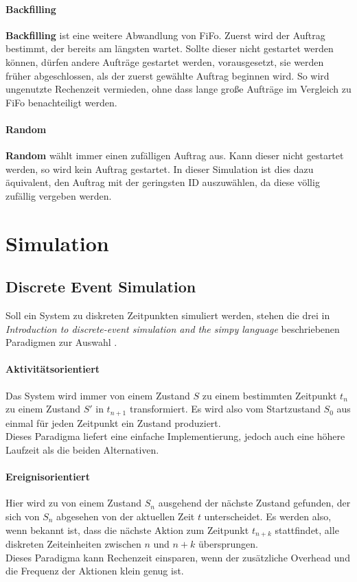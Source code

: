 \paragraph{Backfilling}
\textbf{Backfilling} ist eine weitere Abwandlung von FiFo. Zuerst wird der Auftrag bestimmt, der bereits am längsten wartet. Sollte dieser nicht gestartet werden können, dürfen andere Aufträge gestartet werden, vorausgesetzt, sie werden früher abgeschlossen, als der zuerst gewählte Auftrag beginnen wird. So wird ungenutzte Rechenzeit vermieden, ohne dass lange große Aufträge im Vergleich zu FiFo benachteiligt werden.

\paragraph{Random}
\textbf{Random} wählt immer einen zufälligen Auftrag aus. Kann dieser nicht gestartet werden, so wird kein Auftrag gestartet. In dieser Simulation ist dies dazu äquivalent, den Auftrag mit der geringsten ID auszuwählen, da diese völlig zufällig vergeben werden.

\section{Simulation}

\subsection{Discrete Event Simulation}
Soll ein System zu diskreten Zeitpunkten simuliert werden, stehen die drei in \emph{Introduction to discrete-event simulation and the simpy language} beschriebenen Paradigmen zur Auswahl \cite[p.~3-6]{SimPy}.
\label{paradigma}
\paragraph{Aktivitätsorientiert}
\label{activity}
Das System wird immer von einem Zustand $S$ zu einem bestimmten Zeitpunkt $t_n$ zu einem Zustand $S'$ in $t_{n+1}$ transformiert. Es wird also vom Startzustand $S_0$ aus einmal für jeden Zeitpunkt ein Zustand produziert.\\
Dieses Paradigma liefert eine einfache Implementierung, jedoch auch eine höhere Laufzeit als die beiden Alternativen.
\paragraph{Ereignisorientiert}
Hier wird zu von einem Zustand $S_n$ ausgehend der nächste Zustand gefunden, der sich von $S_n$ abgesehen von der aktuellen Zeit $t$ unterscheidet. Es werden also, wenn bekannt ist, dass die nächste Aktion zum Zeitpunkt $t_{n+k}$ stattfindet, alle diskreten Zeiteinheiten zwischen $n$ und $n+k$ übersprungen.\\
Dieses Paradigma kann Rechenzeit einsparen, wenn der zusätzliche Overhead und die Frequenz der Aktionen klein genug ist.
